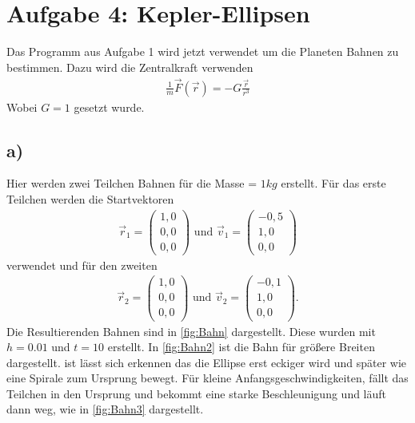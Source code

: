 
\section*{Aufgabe 4: Kepler-Ellipsen}
Das Programm aus Aufgabe 1 wird jetzt verwendet um die Planeten Bahnen zu bestimmen.
Dazu wird die Zentralkraft verwenden
\begin{align}
	\frac{1}{m}\vec{F}(\vec{r})=-G\frac{\vec{r}}{r^3}
\end{align}
Wobei $G=1$ gesetzt wurde.
\subsection*{a)}
Hier werden zwei Teilchen Bahnen für die Masse = $1kg$ erstellt.
Für das erste Teilchen werden die Startvektoren 
\begin{align}
	\vec{r}_1=
	\begin{pmatrix}
		1,0\\0,0\\0,0
	\end{pmatrix}\text{ und }
	\vec{v}_1=
	\begin{pmatrix}
		-0,5\\1,0\\0,0
	\end{pmatrix}
\end{align}
verwendet und für den zweiten
\begin{align}
	\vec{r}_2=
	\begin{pmatrix}
		1,0\\0,0\\0,0
	\end{pmatrix}\text{ und }
	\vec{v}_2=
	\begin{pmatrix}
		-0,1\\1,0\\0,0
	\end{pmatrix}.
\end{align}
Die Resultierenden Bahnen sind in \cref{fig:Bahn} dargestellt.
Diese wurden mit $h=0.01$ und $t=10$ erstellt.
In \cref{fig:Bahn2} ist die Bahn für größere Breiten dargestellt. ist lässt sich erkennen das die Ellipse erst eckiger wird und später wie eine Spirale zum Ursprung bewegt.
Für kleine Anfangsgeschwindigkeiten, fällt das Teilchen in den Ursprung und bekommt eine starke Beschleunigung und läuft dann weg, wie in \cref{fig:Bahn3} dargestellt.\\

